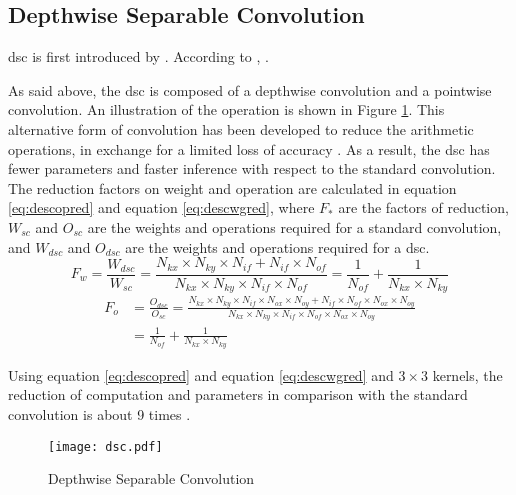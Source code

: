 \subsection{Depthwise Separable Convolution}  \label{subs:dsc}
\acrfull{dsc} is first introduced by \textcite{sifre_ecole_2014}. According to \textcite{chollet_xception_2017}, .

As said above, the \acrshort{dsc} is composed of a depthwise convolution and a pointwise convolution. An illustration of the operation is shown in Figure \ref{fig:dsc}. This alternative form of convolution has been developed to reduce the arithmetic operations, in exchange for a limited loss of accuracy \cite{liu_fpga-based_2019}. As a result, the \acrshort{dsc} has fewer parameters and faster inference with respect to the standard convolution. The reduction factors on weight and operation are calculated in equation \eqref{eq:descopred} and equation \eqref{eq:descwgred}, where $F_{*}$ are the factors of reduction, $W_{sc}$ and $O_{sc}$ are the weights and operations required for a standard convolution, and $W_{dsc}$ and $O_{dsc}$ are the weights and operations required for a \acrshort{dsc}.
%
\begin{equation}
    F_w = \frac{W_{dsc}}{W_{sc}} =
    \frac{N_{kx} \times N_{ky} \times N_{if} + N_{if} \times N_{of}}{N_{kx} \times N_{ky} \times N_{if} \times N_{of}} =
    \frac{1}{N_{of}} + \frac{1}{N_{kx} \times N_{ky}}
    \label{eq:descopred}
\end{equation}
\begin{equation}
    \begin{split}
        F_o &= \frac{O_{dsc}}{O_{sc}} = \frac{N_{kx} \times N_{ky} \times N_{if} \times N_{ox} \times N_{oy} + N_{if} \times N_{of} \times N_{ox} \times N_{oy}}{N_{kx} \times N_{ky} \times N_{if} \times N_{of} \times N_{ox} \times N_{oy}} \\
        &= \frac{1}{N_{of}} + \frac{1}{N_{kx} \times N_{ky}}
    \end{split}
    \label{eq:descwgred}
\end{equation}

Using equation \eqref{eq:descopred} and equation \eqref{eq:descwgred} and $3 \times 3$ kernels, the reduction of computation and parameters in comparison with the standard convolution is about 9 times \cite{zhang_channel_2019}.
%
\begin{figure}
    \texttt{[image: dsc.pdf]}
    \caption{Depthwise Separable Convolution}
    \label{fig:dsc}
\end{figure}

